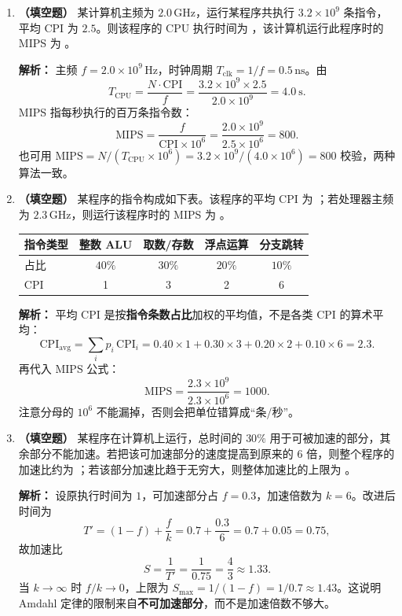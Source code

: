 \begin{enumerate}
\item \textbf{（填空题）} 某计算机主频为 $2.0\,\mathrm{GHz}$，运行某程序共执行 $3.2\times10^{9}$ 条指令，平均 CPI 为 $2.5$。则该程序的 CPU 执行时间为 \underline{\qquad\qquad}，该计算机运行此程序时的 MIPS 为 \underline{\qquad\qquad}。

\ifshowsolutions\par\noindent\textbf{解析：} 主频 $f=2.0\times10^{9}\,\mathrm{Hz}$，时钟周期 $T_{\text{clk}}=1/f=0.5\,\mathrm{ns}$。由
\[
T_{\text{CPU}}=\frac{N\cdot\mathrm{CPI}}{f}
=\frac{3.2\times10^{9}\times2.5}{2.0\times10^{9}}=4.0\ \mathrm{s}.
\]
MIPS 指每秒执行的百万条指令数：
\[
\text{MIPS}=\frac{f}{\mathrm{CPI}\times10^{6}}
=\frac{2.0\times10^{9}}{2.5\times10^{6}}=800.
\]
也可用 $\text{MIPS}=N/(T_{\text{CPU}}\times10^{6})=3.2\times10^{9}/(4.0\times10^{6})=800$ 校验，两种算法一致。\else \answerarea \fi

\item \textbf{（填空题）} 某程序的指令构成如下表。该程序的平均 CPI 为 \underline{\qquad\qquad}；若处理器主频为 $2.3\,\mathrm{GHz}$，则运行该程序时的 MIPS 为 \underline{\qquad\qquad}。
\begin{center}
\begin{tabular}{lcccc}
\toprule
指令类型 & 整数 ALU & 取数/存数 & 浮点运算 & 分支跳转 \\
\midrule
占比 & $40\%$ & $30\%$ & $20\%$ & $10\%$ \\
CPI & 1 & 3 & 2 & 6 \\
\bottomrule
\end{tabular}
\end{center}

\ifshowsolutions\par\noindent\textbf{解析：} 平均 CPI 是按\textbf{指令条数占比}加权的平均值，不是各类 CPI 的算术平均：
\[
\mathrm{CPI}_{\text{avg}}=\sum_i p_i\,\mathrm{CPI}_i
=0.40\times1+0.30\times3+0.20\times2+0.10\times6=2.3.
\]
再代入 MIPS 公式：
\[
\text{MIPS}=\frac{2.3\times10^{9}}{2.3\times10^{6}}=1000.
\]
注意分母的 $10^{6}$ 不能漏掉，否则会把单位错算成“条/秒”。\else \answerarea \fi

\item \textbf{（填空题）} 某程序在计算机上运行，总时间的 $30\%$ 用于可被加速的部分，其余部分不能加速。若把该可加速部分的速度提高到原来的 $6$ 倍，则整个程序的加速比约为 \underline{\qquad\qquad}；若该部分加速比趋于无穷大，则整体加速比的上限为 \underline{\qquad\qquad}。

\ifshowsolutions\par\noindent\textbf{解析：} 设原执行时间为 $1$，可加速部分占 $f=0.3$，加速倍数为 $k=6$。改进后时间为
\[
T'=(1-f)+\frac{f}{k}=0.7+\frac{0.3}{6}=0.7+0.05=0.75,
\]
故加速比
\[
S=\frac{1}{T'}=\frac{1}{0.75}=\frac{4}{3}\approx1.33.
\]
当 $k\to\infty$ 时 $f/k\to0$，上限为 $S_{\max}=1/(1-f)=1/0.7\approx1.43$。这说明 Amdahl 定律的限制来自\textbf{不可加速部分}，而不是加速倍数不够大。\else \answerarea \fi


\end{enumerate}
